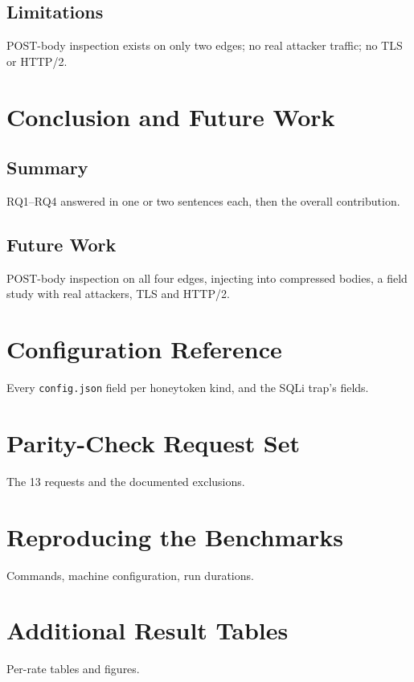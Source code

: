 \documentclass{rptuma}
\begin{document}
\section{Limitations}
POST-body inspection exists on only two edges; no real attacker traffic; no TLS or HTTP/2.

\chapter{Conclusion and Future Work}
\section{Summary}
RQ1--RQ4 answered in one or two sentences each, then the overall contribution.
\section{Future Work}
POST-body inspection on all four edges, injecting into compressed bodies, a field study with real
attackers, TLS and HTTP/2.

\appendix
\chapter{Configuration Reference}
Every \texttt{config.json} field per honeytoken kind, and the SQLi trap's fields.
\chapter{Parity-Check Request Set}
The 13 requests and the documented exclusions.
\chapter{Reproducing the Benchmarks}
Commands, machine configuration, run durations.
\chapter{Additional Result Tables}
Per-rate tables and figures.



\end{document}
